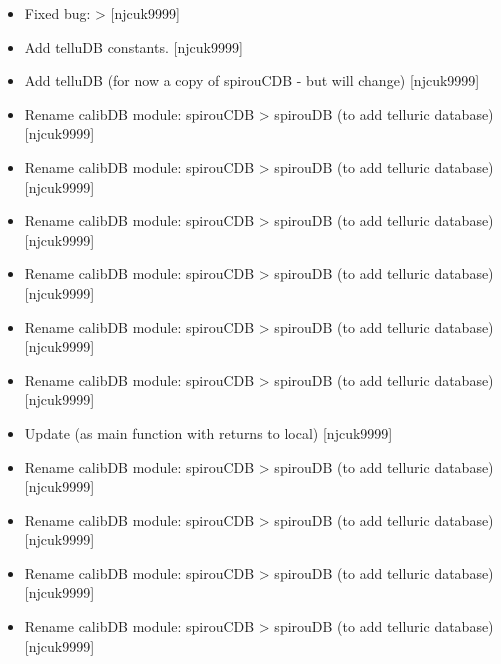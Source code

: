 \documentclass[a4paper,10pt,english]{report}
\begin{document}
\begin{itemize}
\item {} 
Fixed bug:  \textendash{}\textgreater{}  {[}njcuk9999{]}

\item {} 
Add telluDB constants. {[}njcuk9999{]}

\item {} 
Add telluDB (for now a copy of spirouCDB - but will change)
{[}njcuk9999{]}

\item {} 
Rename calibDB module: spirouCDB \textendash{}\textgreater{} spirouDB (to add telluric
database) {[}njcuk9999{]}

\item {} 
Rename calibDB module: spirouCDB \textendash{}\textgreater{} spirouDB (to add telluric
database) {[}njcuk9999{]}

\item {} 
Rename calibDB module: spirouCDB \textendash{}\textgreater{} spirouDB (to add telluric
database) {[}njcuk9999{]}

\item {} 
Rename calibDB module: spirouCDB \textendash{}\textgreater{} spirouDB (to add telluric
database) {[}njcuk9999{]}

\item {} 
Rename calibDB module: spirouCDB \textendash{}\textgreater{} spirouDB (to add telluric
database) {[}njcuk9999{]}

\item {} 
Rename calibDB module: spirouCDB \textendash{}\textgreater{} spirouDB (to add telluric
database) {[}njcuk9999{]}

\item {} 
Update  (as main function with returns to local)
{[}njcuk9999{]}

\item {} 
Rename calibDB module: spirouCDB \textendash{}\textgreater{} spirouDB (to add telluric
database) {[}njcuk9999{]}

\item {} 
Rename calibDB module: spirouCDB \textendash{}\textgreater{} spirouDB (to add telluric
database) {[}njcuk9999{]}

\item {} 
Rename calibDB module: spirouCDB \textendash{}\textgreater{} spirouDB (to add telluric
database) {[}njcuk9999{]}

\item {} 
Rename calibDB module: spirouCDB \textendash{}\textgreater{} spirouDB (to add telluric
database) {[}njcuk9999{]}


\end{itemize}
\end{document}
